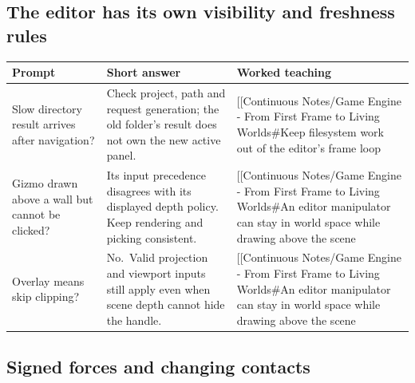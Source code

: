 \subsection{The editor has its own visibility and freshness rules}\label{appendix-64ea716dcadc-the-editor-has-its-own-visibility-and-freshness-rules}

\hypertarget{appendix-64ea716dcadc-the-editor-has-its-own-visibility-and-freshness-rules}{}

{\def\LTcaptype{none} %
\begin{longtable}[]{@{}
  >{\raggedright\arraybackslash}p{}
  >{\raggedright\arraybackslash}p{}
  >{\raggedright\arraybackslash}p{}@{}}
\toprule\noalign{}
\begin{minipage}[b]{\linewidth}\raggedright
Prompt
\end{minipage} & \begin{minipage}[b]{\linewidth}\raggedright
Short answer
\end{minipage} & \begin{minipage}[b]{\linewidth}\raggedright
Worked teaching
\end{minipage} \\
\midrule\noalign{}
\endhead
\bottomrule\noalign{}
\endlastfoot
Slow directory result arrives after navigation? & Check project, path and request generation; the old folder's result does not own the new active panel. & {[}{[}Continuous Notes/Game Engine - From First Frame to Living Worlds\#Keep filesystem work out of the editor's frame loop \\
Gizmo drawn above a wall but cannot be clicked? & Its input precedence disagrees with its displayed depth policy. Keep rendering and picking consistent. & {[}{[}Continuous Notes/Game Engine - From First Frame to Living Worlds\#An editor manipulator can stay in world space while drawing above the scene \\
Overlay means skip clipping? & No.~Valid projection and viewport inputs still apply even when scene depth cannot hide the handle. & {[}{[}Continuous Notes/Game Engine - From First Frame to Living Worlds\#An editor manipulator can stay in world space while drawing above the scene \\
\end{longtable}
}

\subsection{Signed forces and changing contacts}\label{appendix-64ea716dcadc-signed-forces-and-changing-contacts}

